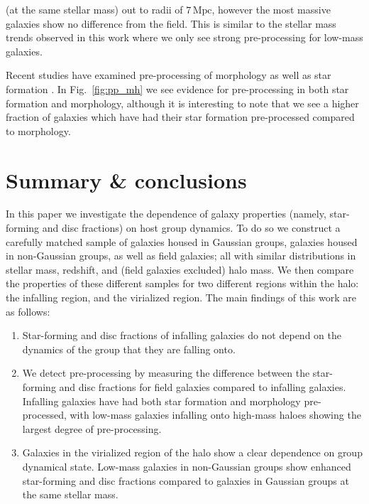\documentclass[a4paper,fleqn,usenatbib]{mnras}
\begin{document}
(at the same stellar mass) out to radii of $7\,\mathrm{Mpc}$, however
the most massive galaxies
show no difference from the field.  This is similar to the stellar
mass trends observed in this work where we only see strong
pre-processing for low-mass galaxies.
\par
Recent studies have examined pre-processing of morphology
\citep[e.g.][]{kodama2001, helsdon2003, moran2007, wilman2009} as well as star
formation \citep[e.g.][]{cortese2006, wetzel2012, bahe2013,
  haines2015}.  In Fig.~\ref{fig:pp_mh} we see evidence for
pre-processing in both star formation and morphology, although it is
interesting to note that we see a higher fraction of galaxies which
have had their star formation pre-processed compared to morphology.


\section{Summary \& conclusions}
\label{sec:summary}

In this paper we investigate the dependence of galaxy properties
(namely, star-forming and disc fractions) on host group dynamics.  To
do so we construct a carefully matched sample of galaxies housed in
Gaussian groups, galaxies housed in non-Gaussian groups, as well as
field galaxies; all with similar distributions in stellar mass,
redshift, and (field galaxies excluded) halo mass.  We then compare
the properties of these different samples for two different regions
within the halo: the infalling region, and the virialized region.  The
main findings of this work are as follows:

\begin{enumerate}
  \item Star-forming and disc fractions of infalling galaxies do not
    depend on the dynamics of the group that they are falling onto.

  \item We detect pre-processing by measuring the difference between
    the star-forming and disc fractions for field galaxies compared to
    infalling galaxies.  Infalling galaxies have had both star
    formation and morphology pre-processed, with low-mass galaxies
    infalling onto high-mass haloes showing the largest degree of
    pre-processing.

  \item Galaxies in the virialized region of the halo show a clear
    dependence on group dynamical state.  Low-mass galaxies in
    non-Gaussian groups show enhanced star-forming and disc fractions
    compared to galaxies in Gaussian groups at the same stellar mass. 
\end{enumerate}
\end{document}

